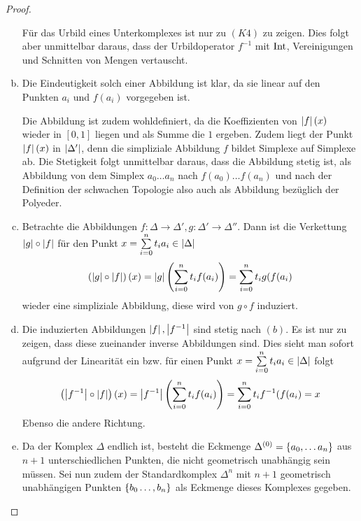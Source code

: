 \begin{Satz}
\begin{proof}
\begin{enumerate}[(a)]
            Für das Urbild eines Unterkomplexes ist nur zu $(K4)$ zu
            zeigen.  Dies folgt aber unmittelbar daraus, dass der
            Urbildoperator $f^{-1}$ mit $\operatorname{Int}$, Vereinigungen und
            Schnitten von Mengen vertauscht.
          \item Die Eindeutigkeit solch einer Abbildung ist klar, da
            sie linear auf den Punkten $a_i$ und $f(a_i)$ vorgegeben
            ist. 

            Die Abbildung ist zudem wohldefiniert, da die
            Koeffizienten von $\left| f \right|(x)$ wieder in $[0,1]$ liegen und
            als Summe die $1$ ergeben. Zudem liegt der Punkt
            $\left| f \right|(x)$ in $\left| \Delta' \right|$, denn die simpliziale
            Abbildung $f$ bildet Simplexe auf Simplexe ab. Die
            Stetigkeit folgt unmittelbar daraus, dass die Abbildung
            stetig ist, als Abbildung von dem Simplex $a_0 \ldots a_n$
            nach $f(a_0)\ldots f(a_n)$ und nach der Definition der
            schwachen Topologie also auch als Abbildung bezüglich der
            Polyeder.
          \item Betrachte die Abbildungen
            $f : \Delta \rightarrow \Delta' , g : \Delta' \rightarrow
            \Delta''$.
            Dann ist die Verkettung $\left| g \right| \circ \left| f \right|$ für den Punkt
            $x = \sum\limits_{i=0}^{n} t_i a_i \in \left| \Delta \right|$
            \begin{gather*}
              \left( \left| g \right| \circ \left| f \right| \right) (x) = \left| g \right| \left(
                \sum\limits_{i=0}^{n} t_i f(a_i) \right) = \sum\limits_{i=0}^{n} t_i g(f(a_i)
            \end{gather*}
            wieder eine simpliziale Abbildung, diese wird von
            $g \circ f$ induziert.
          \item Die induzierten Abbildungen $\left| f \right|,\left| f^{-1} \right|$ sind
            stetig nach $(b)$. Es ist nur zu zeigen, dass diese
            zueinander inverse Abbildungen sind. Dies sieht man sofort
            aufgrund der Linearität ein bzw. für einen Punkt
            $x = \sum\limits_{i=0}^{n} t_i a_i \in \left| \Delta \right|$ folgt
            \begin{gather*}
              \left( \left| f^{-1} \right| \circ \left| f \right| \right) (x) =
              \left| f^{-1} \right| \left( \sum\limits_{i=0}^{n} t_i f(a_i) \right) =
              \sum\limits_{i=0}^{n} t_i f^{-1}(f(a_i) = x
            \end{gather*}
            Ebenso die andere Richtung.
          \item Da der Komplex $\Delta$ endlich ist, besteht die
            Eckmenge $\Delta^{(0)} = \left\{  a_0 , \ldots a_n \right\}$ aus
            $n+1$ unterschiedlichen Punkten, die nicht geometrisch
            unabhängig sein müssen. Sei nun zudem der Standardkomplex
            $\Delta^n$ mit $n+1$ geometrisch unabhängigen Punkten
            $\left\{ b_0 \ldots , b_n \right\}$ als Eckmenge dieses Komplexes
            gegeben.


\end{enumerate}
\end{proof}
\end{Satz}
